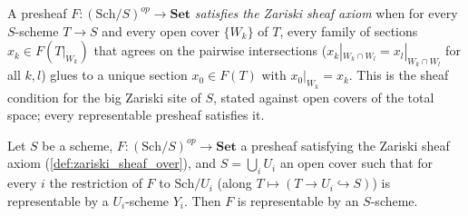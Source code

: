 \begin{definition}\leanok
  \label{def:zariski_sheaf_over}
  A presheaf \(F : (\mathrm{Sch}/S)^{op} \to \mathbf{Set}\) \emph{satisfies
  the Zariski sheaf axiom} when for every \(S\)-scheme \(T \to S\) and every
  open cover \(\{W_k\}\) of \(T\), every family of sections
  \(x_k \in F(T|_{W_k})\) that agrees on the pairwise intersections
  (\(x_k|_{W_k \cap W_l} = x_l|_{W_k \cap W_l}\) for all \(k, l\)) glues to a
  unique section \(x_0 \in F(T)\) with \(x_0|_{W_k} = x_k\).  This is the
  sheaf condition for the big Zariski site of \(S\), stated against open
  covers of the total space; every representable presheaf satisfies it.
\end{definition}

\begin{theorem}\leanok
  \label{thm:representability_zariski_descent}
  Let \(S\) be a scheme, \(F : (\mathrm{Sch}/S)^{op} \to \mathbf{Set}\) a
  presheaf satisfying the Zariski sheaf axiom
  (\cref{def:zariski_sheaf_over}), and \(S = \bigcup_i U_i\) an open cover
  such that for every \(i\) the restriction of \(F\) to
  \(\mathrm{Sch}/U_i\) (along \(T \mapsto (T \to U_i \hookrightarrow S)\))
  is representable by a \(U_i\)-scheme \(Y_i\).  Then \(F\) is representable
  by an \(S\)-scheme.
\end{theorem}

